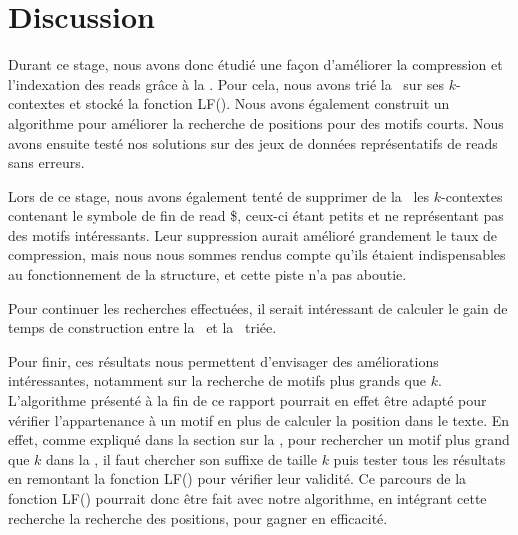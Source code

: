 \section*{Discussion}

Durant ce stage, nous avons donc étudié une façon d'améliorer la compression et l'indexation des reads grâce à la \kbwt. Pour cela, nous avons trié la \kbwt\ sur ses $k$-contextes et stocké la fonction LF(). Nous avons également construit un algorithme pour améliorer la recherche de positions pour des motifs courts. Nous avons ensuite testé nos solutions sur des jeux de données représentatifs de reads sans erreurs.

Lors de ce stage, nous avons également tenté de supprimer de la \kbwt\ les $k$-contextes contenant le symbole de fin de read \$, ceux-ci étant petits et ne représentant pas des motifs intéressants. Leur suppression aurait amélioré grandement le taux de compression, mais nous nous sommes rendus compte qu'ils étaient indispensables au fonctionnement de la structure, et cette piste n'a pas aboutie.

Pour continuer les recherches effectuées, il serait intéressant de calculer le gain de temps de construction entre la \bwt\ et la \kbwt\ triée.

Pour finir, ces résultats nous permettent d'envisager des améliorations intéressantes, notamment sur la recherche de motifs plus grands que $k$. L'algorithme présenté à la fin de ce rapport pourrait en effet être adapté pour vérifier l'appartenance à un motif en plus de calculer la position dans le texte. En effet, comme expliqué dans la section sur la \kbwt, pour rechercher un motif plus grand que $k$ dans la \kbwt, il faut chercher son suffixe de taille $k$ puis tester tous les résultats en remontant la fonction LF() pour vérifier leur validité. Ce parcours de la fonction LF() pourrait donc être fait avec notre algorithme, en intégrant cette recherche la recherche des positions, pour gagner en efficacité.


